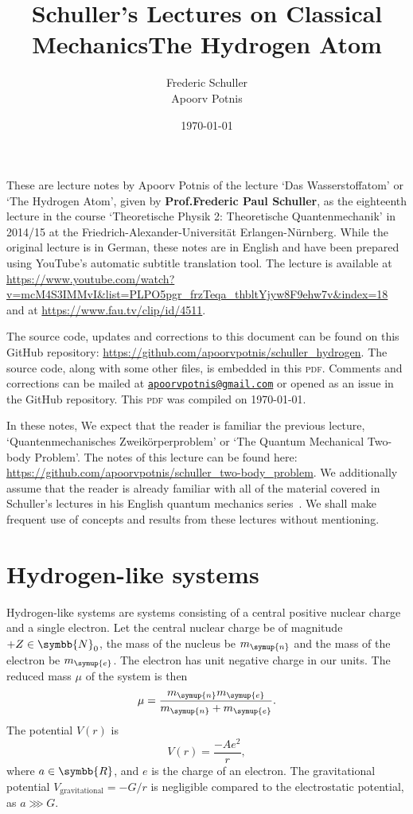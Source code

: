 \documentclass[a4 paper, 12pt]{article}
\title{Schuller's Lectures on Classical Mechanics}
\author{Frederic Schuller\\Apoorv Potnis}
\date{\today}
\title{The Hydrogen Atom}
\author{}
\date{\vspace{-5ex}}
\theoremstyle{definition}
\newcommand{\rr}{\symbb{R}}
\newcommand{\nn}{\symbb{N}_0}
\newcommand{\me}{m_{\symup{e}}}
\newcommand{\mn}{m_{\symup{n}}}
\begin{document}
    \maketitle

    These are lecture notes by Apoorv Potnis of the lecture `Das Wasserstoffatom' or `The Hydrogen Atom', given by \textbf{Prof.\@ Frederic Paul Schuller}, as the eighteenth lecture in the course `Theoretische Physik 2: Theoretische Quantenmechanik' in 2014/15 at the Friedrich-Alexander-Universität Erlangen-Nürnberg. While the original lecture is in German, these notes are in English and have been prepared using YouTube's automatic subtitle translation tool. The lecture is available at \url{https://www.youtube.com/watch?v=mcM4S3IMMvI&list=PLPO5pgr_frzTeqa_thbltYjyw8F9ehw7v&index=18} and at \url{https://www.fau.tv/clip/id/4511}.

    The source code, updates and corrections to this document can be found on this GitHub repository: \url{https://github.com/apoorvpotnis/schuller_hydrogen}. The source code, along with some other files, is embedded in this \textsc{pdf}. Comments and corrections can be mailed at \href{mailto:apoorvpotnis@gmail.com}{\texttt{apoorvpotnis@gmail.com}} or opened as an issue in the GitHub repository. This \textsc{pdf} was compiled on \today.

    In these notes, We expect that the reader is familiar the previous lecture, `Quantenmechanisches Zweikörperproblem' or `The Quantum Mechanical Two-body Problem'. The notes of this lecture can be found here: \url{https://github.com/apoorvpotnis/schuller_two-body_problem}. We additionally assume that the reader is already familiar with all of the material covered in Schuller's lectures in his English quantum mechanics series~\cite{SchullerVideos, Schuller}. We shall make frequent use of concepts and results from these lectures without mentioning.

    \tableofcontents

    \section{Hydrogen-like systems}
    
    Hydrogen-like systems are systems consisting of a central positive nuclear charge and a single electron. Let the central nuclear charge be of magnitude \(+Z \in \nn\), the mass of the nucleus be \(m_{\symup{n}}\) and the mass of the electron be \(m_{\symup{e}}\). The electron has unit negative charge in our units. The reduced mass \(\mu\) of the system is then 
    \[
        \mu = \frac{\mn\me}{\mn + \me}.
    \] The potential \(V(r)\) is \[V(r) = \frac{-Ae^2}{r},\] where \(a \in \rr\), and \(e\) is the charge of an electron. The gravitational potential \(V_{\text{gravitational}} = -G/r\) is negligible compared to the electrostatic potential, as \(a \ggg G\). 
\end{document}
